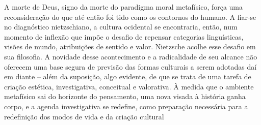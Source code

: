 \documentclass[
	12pt,				%
	openright,			%
	oneside,			%
	a4paper,			%
	english,			%
	french,				%
	spanish,			%
	brazil				%
	]{abntex2}
\begin{document}
A morte de Deus, signo da morte do paradigma moral metafísico, força uma reconsideração do que até então foi tido como os contornos do humano. A fiar-se no diagnóstico nietzschiano, a cultura ocidental se encontraria, então, num momento de inflexão que impõe o desafio de repensar categorias linguísticas, visões de mundo, atribuições de sentido e valor. Nietzsche acolhe esse desafio em sua filosofia. A novidade desse acontecimento e a radicalidade de seu alcance não oferecem uma base segura de previsão das formas culturais a serem adotadas daí em diante – além da suposição, algo evidente, de que se trata de uma tarefa de criação estética, investigativa, conceitual e valorativa. À medida que o ambiente metafísico sai do horizonte do pensamento, uma nova visada à história ganha corpo, e a agenda investigativa se redefine, como preparação necessária para a redefinição dos modos de vida e da criação cultural
\end{document}
